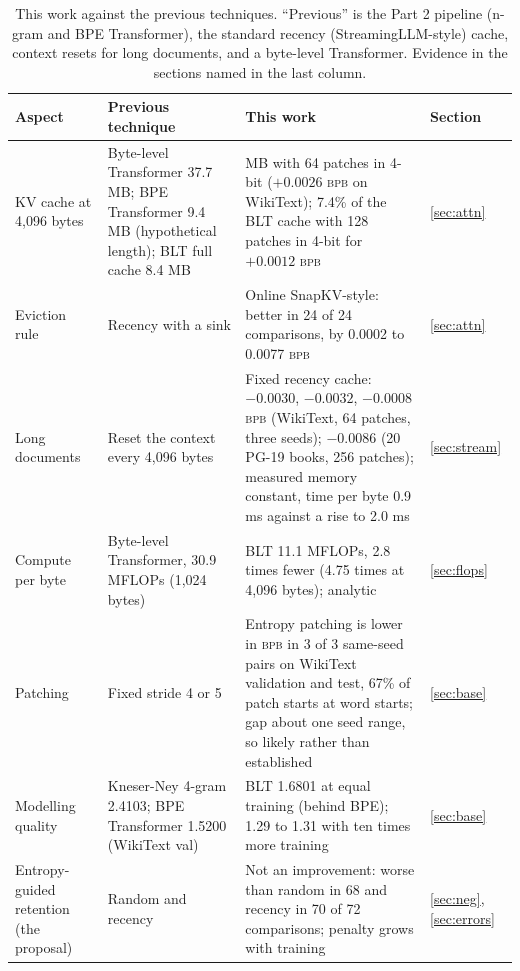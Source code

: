 \documentclass[10pt,twocolumn]{extarticle}
\newcommand{\bpb}{\textsc{bpb}}
\begin{document}
\begin{table}[!t]
\centering\small
\caption{This work against the previous techniques. ``Previous'' is the Part 2 pipeline (n-gram and BPE Transformer), the standard recency (StreamingLLM-style) cache, context resets for long documents, and a byte-level Transformer. Evidence in the sections named in the last column.}\label{tab:gain}
\begin{tabular}{@{}>{\raggedright\arraybackslash}p{2.5cm}>{\raggedright\arraybackslash}p{4.3cm}>{\raggedright\arraybackslash}p{8.0cm}p{1.6cm}@{}}
\toprule
Aspect & Previous technique & This work & Section\\
\midrule
KV cache at 4,096 bytes & Byte-level Transformer 37.7 MB; BPE Transformer 9.4 MB (hypothetical length); BLT full cache 8.4 MB & 0.2 MB with 64 patches in 4-bit ($+0.0026$ \bpb{} on WikiText); 7.4\% of the BLT cache with 128 patches in 4-bit for $+0.0012$ \bpb & \ref{sec:attn}\\
Eviction rule & Recency with a sink & Online SnapKV-style: better in 24 of 24 comparisons, by 0.0002 to 0.0077 \bpb & \ref{sec:attn}\\
Long documents & Reset the context every 4,096 bytes & Fixed recency cache: $-0.0030$, $-0.0032$, $-0.0008$ \bpb{} (WikiText, 64 patches, three seeds); $-0.0086$ (20 PG-19 books, 256 patches); measured memory constant, time per byte 0.9 ms against a rise to 2.0 ms & \ref{sec:stream}\\
Compute per byte & Byte-level Transformer, 30.9 MFLOPs (1,024 bytes) & BLT 11.1 MFLOPs, 2.8 times fewer (4.75 times at 4,096 bytes); analytic & \ref{sec:flops}\\
Patching & Fixed stride 4 or 5 & Entropy patching is lower in \bpb{} in 3 of 3 same-seed pairs on WikiText validation and test, 67\% of patch starts at word starts; gap about one seed range, so likely rather than established & \ref{sec:base}\\
Modelling quality & Kneser-Ney 4-gram 2.4103; BPE Transformer 1.5200 (WikiText val) & BLT 1.6801 at equal training (behind BPE); 1.29 to 1.31 with ten times more training & \ref{sec:base}\\
Entropy-guided retention (the proposal) & Random and recency & Not an improvement: worse than random in 68 and recency in 70 of 72 comparisons; penalty grows with training & \ref{sec:neg}, \ref{sec:errors}\\
\bottomrule
\end{tabular}
\end{table}
\end{document}
